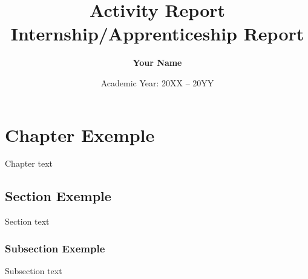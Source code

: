 \documentclass[12pt,a4paper]{report}
\title{\Huge Activity Report\\ \LARGE Internship/Apprenticeship Report}
\author{\textbf{Your Name}}
\date{Academic Year: 20XX -- 20YY}
\begin{document}


\newpage
\tableofcontents
\newpage


\chapter{Chapter Exemple}
Chapter text

\section{Section Exemple}
Section text

\subsection{Subsection Exemple}
Subsection text

\newpage


\newpage

\end{document}
